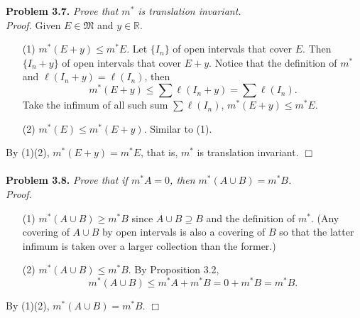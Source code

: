 \documentclass{article}
\begin{document}
\textbf{Problem 3.7.}
\emph{Prove that $m^{*}$ is translation invariant.} \\



\emph{Proof.}
Given $E \in \mathfrak{M}$ and $y \in \mathbb{R}$.
\begin{enumerate}
\item[(1)]
  $m^{*}(E + y) \leq m^{*}E$.
  Let $\{ I_n \}$ of open intervals that cover $E$.
  Then $\{ I_n+y \}$ of open intervals that cover $E+y$.
  Notice that the definition of $m^{*}$ and $\ell(I_n+y) = \ell(I_n)$, then
  \[
    m^{*}(E + y) \leq \sum \ell(I_n+y) = \sum \ell(I_n).
  \]
  Take the infimum of all such sum $\sum \ell(I_n)$,
  $m^{*}(E + y) \leq m^{*}E$.

\item[(2)]
  $m^{*}(E) \leq m^{*}(E + y)$.
  Similar to (1).
\end{enumerate}
By (1)(2), $m^{*}(E + y) = m^{*}E$, that is, $m^{*}$ is translation invariant.
$\Box$ \\\\






\textbf{Problem 3.8.}
\emph{Prove that if $m^{*}A = 0$, then $m^{*}(A \cup B) = m^{*}B$.} \\



\emph{Proof.}
\begin{enumerate}
\item[(1)]
  $m^{*}(A \cup B) \geq m^{*}B$ since $A \cup B \supseteq B$
  and the definition of $m^{*}$.
  (Any covering of $A \cup B$ by open intervals is also a covering of $B$
  so that the latter infimum is taken over a larger collection than the former.)

\item[(2)]
  $m^{*}(A \cup B) \leq m^{*}B$.
  By Proposition 3.2,
  \[
    m^{*}(A \cup B) \leq m^{*}A + m^{*}B = 0 + m^{*}B = m^{*}B.
  \]
\end{enumerate}
By (1)(2), $m^{*}(A \cup B) = m^{*}B$.
$\Box$ \\\\



\end{document}
